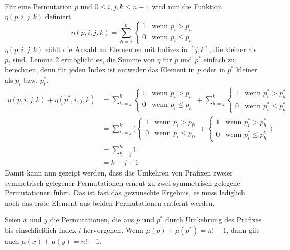 \documentclass[a4paper, 10pt, ngerman]{article}
\begin{document}
Für eine Permutation $p$ und $0 \le i, j, k \le n - 1$ wird nun die Funktion $\eta(p, i, j, k)$ definiert.
$$
    \eta(p, i, j, k) = \sum_{h = j}^k
    \begin{cases}
        1 & \text{wenn } p_i > p_h   \\
        0 & \text{wenn } p_i \le p_h
    \end{cases}
$$
$\eta(p, i, j, k)$ zählt die Anzahl an Elementen mit Indizes in $[j, k]$, die kleiner als $p_i$ sind. Lemma 2 ermöglicht es, die Summe von $\eta$ für $p$ und $p^*$ einfach zu berechnen, denn für jeden Index ist entweder das Element in $p$ oder in $p^*$ kleiner als $p_i$ bzw. $p^*_i$.
\begin{align*}
    \eta(p, i, j, k) + \eta(p^*, i, j, k) & = \sum_{h = j}^k
    \begin{cases}
        1 & \text{wenn } p_i > p_h   \\
        0 & \text{wenn } p_i \le p_h
    \end{cases} + \sum_{h = j}^k
    \begin{cases}
        1 & \text{wenn } p^*_i > p^*_h   \\
        0 & \text{wenn } p^*_i \le p^*_h
    \end{cases}                                 \\
                                          & = \sum_{h = j}^k \Bigg (
    \begin{cases}
            1 & \text{wenn } p_i > p_h   \\
            0 & \text{wenn } p_i \le p_h
        \end{cases} +
    \begin{cases}
            1 & \text{wenn } p^*_i > p^*_h   \\
            0 & \text{wenn } p^*_i \le p^*_h
        \end{cases} \Bigg )                                 \\
                                          & = \sum_{h = j}^k 1       \\
                                          & = k - j + 1
\end{align*}
Damit kann nun gezeigt werden, dass das Umkehren von Präfixen zweier symmetrisch gelegener Permutationen erneut zu zwei symmetrisch gelegene Permutationen führt. Das ist fast das gewünschte Ergebnis, es muss lediglich noch das erste Element aus beiden Permutationen entfernt werden.

\begin{lemma}Seien $x$ und $y$ die Permutationen, die aus $p$ und $p^*$ durch Umkehrung des Präfixes bis einschließlich Index $i$ hervorgehen. Wenn $\mu(p) + \mu(p^*) = n! - 1$, dann gilt auch $\mu(x) + \mu(y) = n! - 1$.
\end{lemma}
\end{document}
